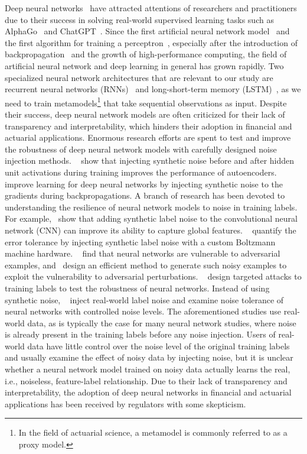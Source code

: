 \documentclass{article}
\begin{document}
Deep neural networks~\citep{hastie2009elements,lecun2015deep} have attracted attentions of researchers and practitioners due to their success in solving real-world supervised learning tasks such as AlphaGo~\citep{silver2016mastering} and ChatGPT~\citep{chatgpt}.
Since the first artificial neural network model~\citep{mcculloch1943logical} and the first algorithm for training a perceptron~\citep{rosenblatt1958perceptron}, especially after the introduction of backpropagation~\citep{rumelhart1985learning} and the growth of high-performance computing, the field of artificial neural network and deep learning in general has grown rapidly.
Two specialized neural network architectures that are relevant to our study are recurrent neural networks (RNNs)~\citep{williams1989learning,sutskever2014sequence} and long-short-term memory (LSTM)~\citep{hochreiter1997long,chung2014empirical}, as we need to train metamodels\footnote{In the field of actuarial science, a metamodel is commonly referred to as a proxy model.} that take sequential observations as input.
Despite their success, deep neural network models are often criticized for their lack of transparency and interpretability, which hinders their adoption in financial and actuarial applications.
Enormous research efforts are spent to test and improve the robustness of deep neural network models with carefully designed noise injection methods.
~\cite{poole2014analyzing} show that injecting synthetic noise before and after hidden unit activations during training improves the performance of autoencoders.
~\cite{neelakantan2015adding} improve learning for deep neural networks by injecting synthetic noise to the gradients during backpropagations.
A branch of research has been devoted to understanding the resilience of neural network models to noise in training labels.
For example,~\cite{luo2016understanding} show that adding synthetic label noise to the convolutional neural network (CNN) can improve its ability to capture global features. 
~\cite{srivastava2014dropout} quantify the error tolerance by injecting synthetic label noise with a custom Boltzmann machine hardware.
~\cite{szegedy2013intriguing} find that neural networks are vulnerable to adversarial examples, and~\cite{goodfellow2014explaining} design an efficient method to generate such noisy examples to exploit the vulnerability to adversarial perturbations.
~\cite{carlini2017towards} design targeted attacks to training labels to test the robustness of neural networks. 
Instead of using synthetic noise, ~\cite{jiang2020beyond} inject real-world label noise and examine noise tolerance of neural networks with controlled noise levels.
The aforementioned studies use real-world data, as is typically the case for many neural network studies, where noise is already present in the training labels before any noise injection.
Users of real-world data have little control over the noise level of the original training labels and usually examine the effect of noisy data by injecting noise, but it is unclear whether a neural network model trained on noisy data actually learns the real, i.e., noiseless, feature-label relationship.
Due to their lack of transparency and interpretability, the adoption of deep neural networks in financial and actuarial applications has been received by regulators with some skepticism.
\end{document}
